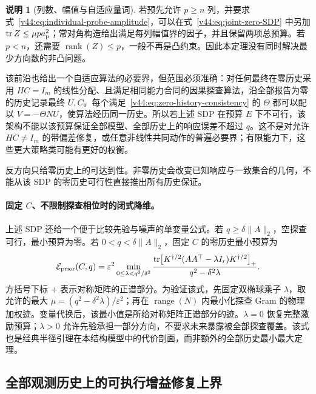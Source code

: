 \documentclass[11pt,a4paper]{article}
\numberwithin{equation}{section}
\theoremstyle{definition}
\newtheorem{remark}[theorem]{说明}
\begin{document}
\begin{remark}[列数、幅值与自适应量词]
\label{v44:rem:joint-SDP-scope}
若预先允许 $p\ge n$ 列，并要求式~\eqref{v44:eq:individual-probe-amplitude}，可以在式~\eqref{v44:eq:joint-zero-SDP} 中另加 $\operatorname{tr}Z\le\mu p a_{\rm p}^2$；常对角构造给出满足每列幅值界的因子，并且保留两项总预算。若 $p<n$，还需要 $\operatorname{rank}(Z)\le p$，一般不再是凸约束。因此本定理没有同时解决最少方向数的非凸问题。

该前沿也给出一个自适应算法的必要界，但范围必须准确：对任何最终在零历史采用 $HC=I_m$ 的线性分配、且满足相同能力合同的因果探查算法，沿全部报告为零的历史记录最终 $U,C$。每个满足~\eqref{v44:eq:zero-history-consistency} 的 $\Theta$ 都可以配以 $V=-\Theta NU$，使算法经历同一历史。所以若上述 SDP 在预算 $E$ 下不可行，该架构不能以该预算保证全部模型、全部历史上的响应误差不超过 $q$。这不是对允许 $HC\ne I_m$ 的带偏差修复，或任意非线性共同动作的普遍必要界；有限能力下，这些更大策略类可能有更好的权衡。

反方向只给零历史上的可达到性。非零历史会改变已知响应与一致集合的几何，不能从该 SDP 的零历史可行性直接推出所有历史保证。
\end{remark}

\paragraph{固定 $C$、不限制探查相位时的闭式降维。}
上述 SDP 还给一个便于比较先验与噪声的单变量公式。若 $q\ge\delta\|A\|_2$，空探查可行，最小预算为零。若 $0<q<\delta\|A\|_2$，固定 $C$ 的零历史最小预算为
\begin{equation}
 \mathcal E_{\rm prior}(C,q)
 =\varepsilon^2
 \min_{0\le\lambda<q^2/\delta^2}
 \frac{
 \operatorname{tr}\!\left[
 K^{\dagger/2}(AA^\top-\lambda I_r)K^{\dagger/2}
 \right]_+
 }{q^2-\delta^2\lambda}.
 \label{v44:eq:prior-energy-profile}
\end{equation}
方括号下标 $+$ 表示对称矩阵的正谱部分。为验证该式，先固定双椭球乘子 $\lambda$，取允许的最大 $\mu=(q^2-\delta^2\lambda)/\varepsilon^2$；再在 $\operatorname{range}(N)$ 内最小化探查 Gram 的物理加权迹。变量代换后，该最小值是所给对称矩阵正谱部分的迹。$\lambda=0$ 恢复完整激励预算；$\lambda>0$ 允许先验承担一部分方向，不要求未来暴露被全部探查覆盖。该式也是经典半径引理在本结构模型中的代价剖面，而非额外的全部历史最小最大定理。

\subsection{全部观测历史上的可执行增益修复上界}
\end{document}
